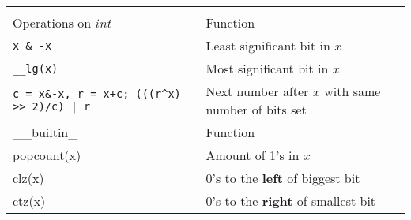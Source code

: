 \small
\begin{tabular}{ |p{3cm}|p{5cm}|  }
  \hline  
  \rowcolor{Gray} 
  \multicolumn{2}{|c|}{Bits++} \\
  \rowcolor{Gray} 
  \hline
  Operations on $int$ & Function \\
  \hline
  \texttt{x \& -x} & Least significant bit in $x$ \\
  \rowcolor{Gray} 
  \texttt{\_\_lg(x)} & Most significant bit in $x$ \\
  \texttt{c = x\&-x, r = x+c; (((r\^{}x) >> 2)/c) | r} & Next number after $x$ with same number of bits set \\
  \hline
  \rowcolor{Gray} 
  \_\_builtin\_ & Function \\
  \hline 
  popcount(x) & Amount of 1's in $x$ \\
  \rowcolor{Gray} 
  clz(x) & 0's to the \textbf{left} of biggest bit \\
  ctz(x) & 0's to the \textbf{right} of smallest bit \\
  \hline
\end{tabular}
